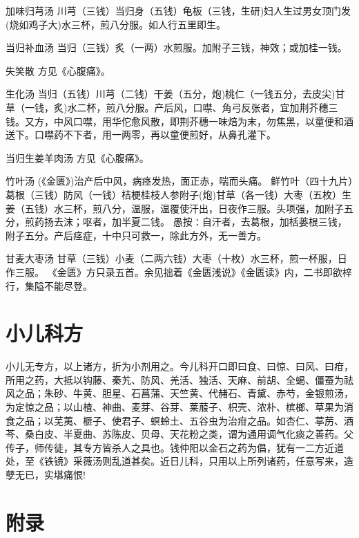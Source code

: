 \documentclass[a4paper,12pt,UTF8,twoside]{ctexbook}
\begin{document}
	加味归芎汤
	川芎（三钱）当归身（五钱）龟板（三钱，生研)妇人生过男女顶门发(烧如鸡子大)水三杯，煎八分服。如人行五里即生。
	
	当归补血汤
	当归（三钱）炙（一两）水煎服。加附子三钱，神效；或加桂一钱。
	
	失笑散
	方见《心腹痛》。
	
	生化汤
	当归（五钱）川芎（二钱）干姜（五分，炮)桃仁（一钱五分，去皮尖)甘草（一钱，炙)水二杯，煎八分服。产后风，口噤、角弓反张者，宜加荆芥穗三钱。又方，中风口噤，用华佗愈风散，即荆芥穗一味焙为末，勿焦黑，以童便和酒送下。口噤药不下者，用一两零，再以童便煎好，从鼻孔灌下。
	
	当归生姜羊肉汤
	方见《心腹痛》。
	
	竹叶汤
	(《金匮》)治产后中风，病痉发热，面正赤，喘而头痛。
	鲜竹叶（四十九片）葛根（三钱）防风（一钱）桔梗桂枝人参附子(炮)甘草（各一钱）大枣（五枚）生姜（五钱）水三杯，煎八分，温服，温覆使汗出，日夜作三服。头项强，加附子五分，煎药扬去沫；呕者，加半夏二钱。
	愚按∶自汗者，去葛根，加栝蒌根三钱，附子五分。产后痉症，十中只可救一，除此方外，无一善方。
	
	甘麦大枣汤
	甘草（三钱）小麦（二两六钱）大枣（十枚）水三杯，煎一杯服，日作三服。
	《金匮》方只录五首。余见拙着《金匮浅说》《金匮读》内，二书即欲梓行，集隘不能尽登。
	
	\chapter{小儿科方}
	    小儿无专方，以上诸方，折为小剂用之。今儿科开口即曰食、曰惊、曰风、曰疳，所用之药，大抵以钩藤、秦艽、防风、羌活、独活、天麻、前胡、全蝎、僵蚕为祛风之品；朱砂、牛黄、胆星、石菖蒲、天竺黄、代赭石、青黛、赤芍，金银煎汤，为定惊之品；以山楂、神曲、麦芽、谷芽、莱菔子、枳壳、浓朴、槟榔、草果为消食之品；以芜荑、榧子、使君子、螟蛉土、五谷虫为治疳之品。如杏仁、葶苈、酒芩、桑白皮、半夏曲、苏陈皮、贝母、天花粉之类，谓为通用调气化痰之善药。父传子，师传徒，其专方皆杀人之具也。钱仲阳以金石之药为倡，犹有一二方近道处，至《铁镜》采薇汤则乱道甚矣。近日儿科，只用以上所列诸药，任意写来，造孽无已，实堪痛恨!
	
	\chapter{附录}
\end{document}
